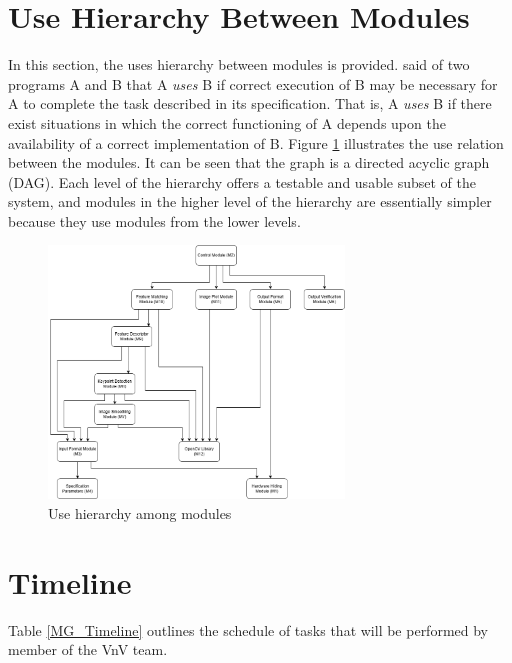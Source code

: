 \documentclass[12pt, titlepage]{article}
\begin{document}
\section{Use Hierarchy Between Modules} \label{SecUse}

In this section, the uses hierarchy between modules is
provided. \citet{Parnas1978} said of two programs A and B that A {\em uses} B if
correct execution of B may be necessary for A to complete the task described in
its specification. That is, A {\em uses} B if there exist situations in which
the correct functioning of A depends upon the availability of a correct
implementation of B.  Figure \ref{FigUH} illustrates the use relation between
the modules. It can be seen that the graph is a directed acyclic graph
(DAG). Each level of the hierarchy offers a testable and usable subset of the
system, and modules in the higher level of the hierarchy are essentially simpler
because they use modules from the lower levels.

\begin{figure}[H]
\centering
\includegraphics[width=0.7\textwidth]{UsesHierarchy.png}
\caption{Use hierarchy among modules}
\label{FigUH}
\end{figure}

\section{Timeline}
Table \ref{MG_Timeline} outlines the schedule of tasks that will be performed by member of the VnV team.
\end{document}
